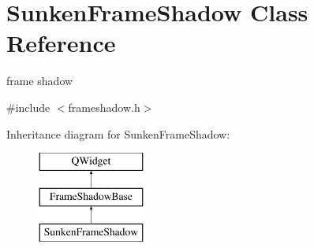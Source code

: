 \hypertarget{class_sunken_frame_shadow}{}\section{Sunken\+Frame\+Shadow Class Reference}
\label{class_sunken_frame_shadow}


frame shadow  




{\ttfamily \#include $<$frameshadow.\+h$>$}

Inheritance diagram for Sunken\+Frame\+Shadow\+:\begin{figure}[H]
\begin{center}
\leavevmode
\includegraphics[height=3.000000cm]{class_sunken_frame_shadow}
\end{center}
\end{figure}
